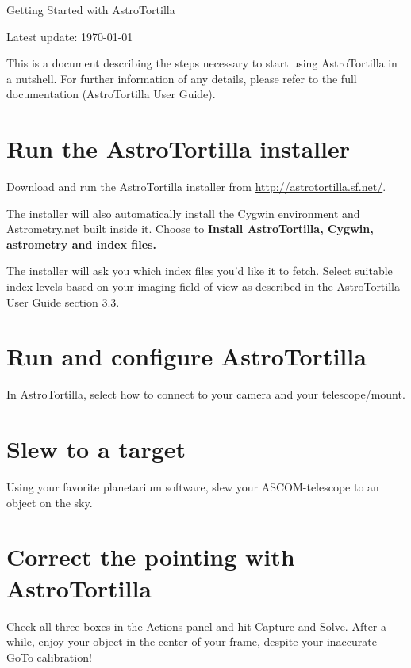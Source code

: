 \documentclass[english]{article}
\newcommand{\surl}[1]{{\small \url{#1}}}
\begin{document}
\centerline{\sf \Huge Getting Started with AstroTortilla}
\centerline{Latest update: \today}

This is a document describing the steps necessary to start using AstroTortilla in a nutshell.
For further information of any details, please refer to the full documentation (AstroTortilla User
Guide).

\section{Run the AstroTortilla installer}

Download and run the AstroTortilla installer from \surl{http://astrotortilla.sf.net/}. 

The installer will also automatically install the Cygwin environment and Astrometry.net built inside it. Choose to \textbf{Install AstroTortilla, Cygwin, astrometry and index files.}

The installer will ask you which index files you'd like it to fetch. Select suitable index levels based on your imaging field of view as described in the AstroTortilla User Guide section 3.3.

\section{Run and configure AstroTortilla}

In AstroTortilla, select how to connect to your camera and your telescope/mount.

\section{Slew to a target}

Using your favorite planetarium software, slew your ASCOM-telescope to an object on the sky.

\section{Correct the pointing with AstroTortilla}

Check all three boxes in the Actions panel and hit Capture and Solve. After a while, enjoy your object in the center of your frame, despite your inaccurate GoTo calibration!
 
\end{document}
